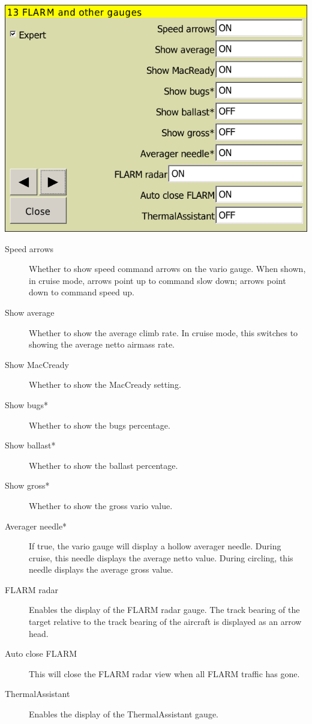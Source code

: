 \begin{center}
\includegraphics[angle=0,width=0.8\linewidth,keepaspectratio='true']{figures/config-othergauges.png}
\end{center}
\label{conf:variogauge}
\begin{description}
\item[Speed arrows]  Whether to show speed command arrows on the vario gauge.
When shown, in cruise mode, arrows point up to command slow down; arrows point down to command speed up.
\item[Show average]  Whether to show the average climb rate.  In cruise mode, this switches to showing the average 
netto airmass rate.
\item[Show MacCready]  Whether to show the MacCready setting.
\item[Show bugs*]  Whether to show the bugs percentage.
\item[Show ballast*]  Whether to show the ballast percentage.
\item[Show gross*]  Whether to show the gross vario value.
\item[Averager needle*]  If true, the vario gauge will display a hollow averager
needle.  During cruise, this needle displays the average netto value.  During circling, this needle displays the average gross value.
\item[FLARM radar]  \label{conf:flarmdisplay} Enables the display of the FLARM
radar gauge. The track bearing of the target relative to the track bearing of the aircraft 
is displayed as an arrow head.
\item[Auto close FLARM]  This will close the FLARM radar view when all
FLARM traffic has gone.
\item[ThermalAssistant] \label{conf:thermalassistant} Enables the display of the
ThermalAssistant gauge.
\end{description}

